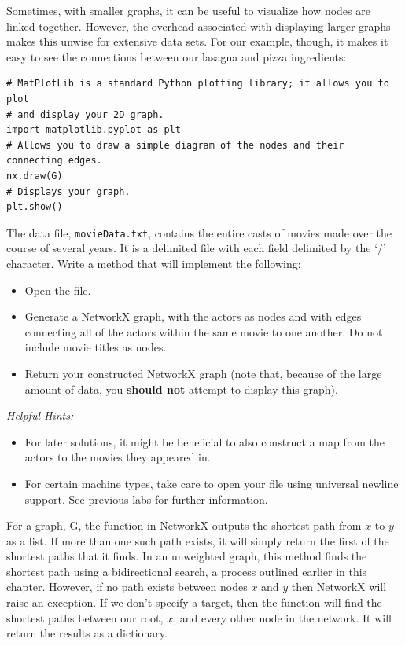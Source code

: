 Sometimes, with smaller graphs, it can be useful to visualize how nodes are linked together. However, the overhead associated with displaying larger graphs makes this unwise for extensive data sets.
For our example, though, it makes it easy to see the connections between our lasagna and pizza ingredients:

\begin{lstlisting}
# MatPlotLib is a standard Python plotting library; it allows you to plot
# and display your 2D graph.
import matplotlib.pyplot as plt
# Allows you to draw a simple diagram of the nodes and their connecting edges.
nx.draw(G)
# Displays your graph.
plt.show()
\end{lstlisting}


\begin{problem}
The data file, \texttt{movieData.txt}, contains the entire casts of movies made over the course of several years. It is a delimited file with each field delimited by the `/' character. Write a method that will implement the following:
\begin{itemize}
\item Open the file.
\item Generate a NetworkX graph, with the actors as nodes and with edges connecting all of the actors within the same movie to one another. Do not include movie titles as nodes.
\item Return your constructed NetworkX graph (note that, because of the large amount of data, you \textbf{should not} attempt to display this graph).
\end{itemize}
\emph{Helpful Hints:}
\begin{itemize}
\item For later solutions, it might be beneficial to also construct a map from the actors to the movies they appeared in.
\item For certain machine types, take care to open your file using universal newline support. See previous labs for further information.
\end{itemize}
\end{problem}

For a graph, G, the  function in NetworkX outputs
the shortest path from $x$ to $y$ as a list. If more than one such path exists,
it will simply return the first of the shortest paths that it finds. In an
unweighted graph, this method finds the shortest path using a bidirectional search,
a process outlined earlier in this chapter. However, if no path exists between nodes
$x$ and $y$ then NetworkX will raise an exception. If we don't specify a
target, then the function will find the shortest paths between our root,
$x$, and every other node in the network.  It will return the results as a dictionary.


